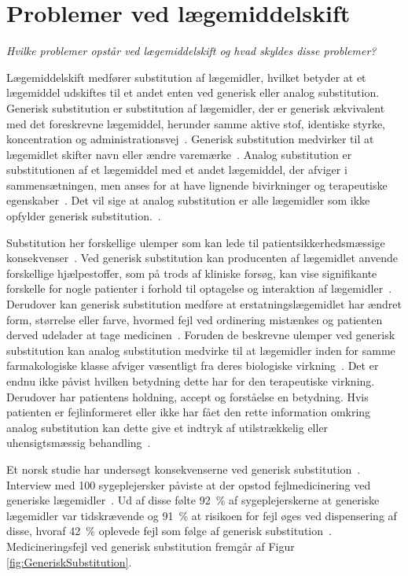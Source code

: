 \section{Problemer ved lægemiddelskift} \label{sec:ProblemLaeg}
\textit{Hvilke problemer opstår ved lægemiddelskift og hvad skyldes disse problemer?}

Lægemiddelskift medfører substitution af lægemidler, hvilket betyder at et lægemiddel udskiftes til et andet enten ved generisk eller analog substitution. Generisk substitution er substitution af lægemidler, der er generisk ækvivalent med det foreskrevne lægemiddel, herunder samme aktive stof, identiske styrke, koncentration og administrationsvej~\citep{DanskSelskabforPatientsikkerhed2009, Kairi2017}. Generisk substitution medvirker til at lægemidlet skifter navn eller ændre varemærke~\citep{Kairi2017}. Analog substitution er substitutionen af et lægemiddel med et andet lægemiddel, der afviger i sammensætningen, men anses for at have lignende bivirkninger og terapeutiske egenskaber~\citep{DanskSelskabforPatientsikkerhed2009, Kairi2017}. Det vil sige at analog substitution er alle lægemidler som ikke opfylder generisk substitution.~\citep{Kairi2017}.

Substitution her forskellige ulemper som kan lede til patientsikkerhedsmæssige konsekvenser~\citep{DanskSelskabforPatientsikkerhed2009}. Ved generisk substitution kan producenten af lægemidlet anvende forskellige hjælpestoffer, som på trods af kliniske forsøg, kan vise signifikante forskelle for nogle patienter i forhold til optagelse og interaktion af lægemidler~\citep{Kairi2017}. Derudover kan generisk substitution medføre at erstatningslægemidlet har ændret form, størrelse eller farve, hvormed fejl ved ordinering mistænkes og patienten derved udelader at tage medicinen~\citep{Kairi2017}. Foruden de beskrevne ulemper ved generisk substitution kan analog substitution medvirke til at lægemidler inden for samme farmakologiske klasse afviger væsentligt fra deres biologiske virkning~\citep{Kairi2017}. Det er endnu ikke påvist hvilken betydning dette har for den terapeutiske virkning. Derudover har patientens holdning, accept og forståelse en betydning. Hvis patienten er fejlinformeret eller ikke har fået den rette information omkring analog substitution kan dette give et indtryk af utilstrækkelig eller uhensigtsmæssig behandling~\citep{Kairi2017}. 

Et norsk studie har undersøgt konsekvenserne ved generisk substitution~\citep{Hakonsen2010}. Interview med 100 sygeplejersker påviste at der opstod fejlmedicinering ved generiske lægemidler~\citep{Hakonsen2010}. Ud af disse følte 92~\% af sygeplejerskerne at generiske lægemidler var tidskrævende og 91~\% at risikoen for fejl øges ved dispensering af disse, hvoraf 42~\% oplevede fejl som følge af generisk substitution~\citep{Hakonsen2010}.
Medicineringsfejl ved generisk substitution fremgår af Figur \ref{fig:GeneriskSubstitution}.

